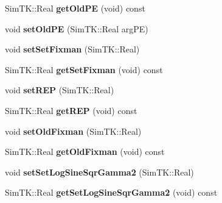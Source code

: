 \begin{DoxyCompactItemize}
\item 
Sim\+T\+K\+::\+Real {\bfseries get\+Old\+PE} (void) const \hypertarget{classMonteCarloSampler_ad1248e740d46b90e0f2cfcdeaa94fc92}{}\label{classMonteCarloSampler_ad1248e740d46b90e0f2cfcdeaa94fc92}

\item 
void {\bfseries set\+Old\+PE} (Sim\+T\+K\+::\+Real arg\+PE)\hypertarget{classMonteCarloSampler_a541f5de0ef4ee9ec8963d11750be4b9b}{}\label{classMonteCarloSampler_a541f5de0ef4ee9ec8963d11750be4b9b}

\item 
void {\bfseries set\+Set\+Fixman} (Sim\+T\+K\+::\+Real)\hypertarget{classMonteCarloSampler_a5bc8474546ba1a04a7dc9c37069963b2}{}\label{classMonteCarloSampler_a5bc8474546ba1a04a7dc9c37069963b2}

\item 
Sim\+T\+K\+::\+Real {\bfseries get\+Set\+Fixman} (void) const \hypertarget{classMonteCarloSampler_ad0f7f3e1554620e467e1f519a7600736}{}\label{classMonteCarloSampler_ad0f7f3e1554620e467e1f519a7600736}

\item 
void {\bfseries set\+R\+EP} (Sim\+T\+K\+::\+Real)\hypertarget{classMonteCarloSampler_a8dc6b458ce92bb91396e92d172fc94fc}{}\label{classMonteCarloSampler_a8dc6b458ce92bb91396e92d172fc94fc}

\item 
Sim\+T\+K\+::\+Real {\bfseries get\+R\+EP} (void) const \hypertarget{classMonteCarloSampler_a9b525f238f6290d2b74680ca96425db7}{}\label{classMonteCarloSampler_a9b525f238f6290d2b74680ca96425db7}

\item 
void {\bfseries set\+Old\+Fixman} (Sim\+T\+K\+::\+Real)\hypertarget{classMonteCarloSampler_a45c88aa68467e55b253f4d38aa044663}{}\label{classMonteCarloSampler_a45c88aa68467e55b253f4d38aa044663}

\item 
Sim\+T\+K\+::\+Real {\bfseries get\+Old\+Fixman} (void) const \hypertarget{classMonteCarloSampler_a14aa5d89fd3832ebb63b2cff48d76fd2}{}\label{classMonteCarloSampler_a14aa5d89fd3832ebb63b2cff48d76fd2}

\item 
void {\bfseries set\+Set\+Log\+Sine\+Sqr\+Gamma2} (Sim\+T\+K\+::\+Real)\hypertarget{classMonteCarloSampler_a569d624b7c74ebffecb31153231c7314}{}\label{classMonteCarloSampler_a569d624b7c74ebffecb31153231c7314}

\item 
Sim\+T\+K\+::\+Real {\bfseries get\+Set\+Log\+Sine\+Sqr\+Gamma2} (void) const \hypertarget{classMonteCarloSampler_a091f14ccd03de6141b247a4f0c4775b7}{}\label{classMonteCarloSampler_a091f14ccd03de6141b247a4f0c4775b7}


\end{DoxyCompactItemize}
